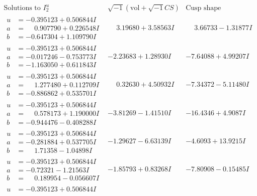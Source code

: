 \documentclass[1p]{elsarticle_modified}
\theoremstyle{definition}
\newcommand{\I}{\sqrt{-1}}
\begin{document}
$$\begin{array}{c|c|c}  
\text{Solutions to }I^u_{2}& \I (\text{vol} + \sqrt{-1}CS) & \text{Cusp shape}\\
 \hline 
\begin{aligned}
u &= -0.395123 + 0.506844 I \\
a &= \phantom{-}0.907790 + 0.226548 I \\
b &= -0.647304 + 1.109790 I\end{aligned}
 & \phantom{-}3.19680 + 3.58563 I & \phantom{-}3.66733 - 1.31877 I \\ \hline\begin{aligned}
u &= -0.395123 + 0.506844 I \\
a &= -0.017246 - 0.753773 I \\
b &= -1.163050 + 0.611843 I\end{aligned}
 & -2.23683 + 1.28930 I & -7.64088 + 4.99207 I \\ \hline\begin{aligned}
u &= -0.395123 + 0.506844 I \\
a &= \phantom{-}1.277480 + 0.112709 I \\
b &= -0.886862 + 0.535701 I\end{aligned}
 & \phantom{-}0.32630 + 4.50932 I & -7.34372 - 5.11480 I \\ \hline\begin{aligned}
u &= -0.395123 + 0.506844 I \\
a &= \phantom{-}0.578173 + 1.190000 I \\
b &= -0.944476 - 0.408288 I\end{aligned}
 & -3.81269 - 1.41510 I & -16.4346 + 4.9087 I \\ \hline\begin{aligned}
u &= -0.395123 + 0.506844 I \\
a &= -0.281884 + 0.537705 I \\
b &= \phantom{-}1.71358 - 1.04898 I\end{aligned}
 & -1.29627 - 6.63139 I & -4.6093 + 13.9215 I \\ \hline\begin{aligned}
u &= -0.395123 + 0.506844 I \\
a &= -0.72321 - 1.21563 I \\
b &= \phantom{-}0.189954 - 0.056607 I\end{aligned}
 & -1.85793 + 0.83268 I & -7.80908 - 0.15485 I \\ \hline\begin{aligned}
u &= -0.395123 + 0.506844 I \\

\end{aligned}
\end{array}$$
\end{document}
